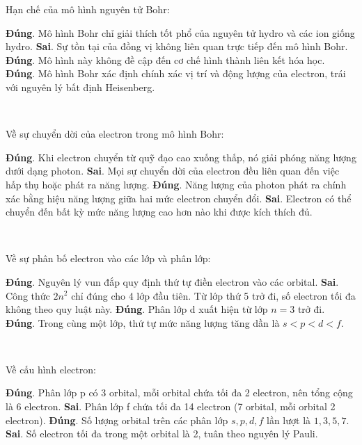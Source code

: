 \def\writeANS{\TLdung{A}\TLsai{B}\TLdung{C}\TLdung{D}}
\begin{loigiaiex}{20}
  Hạn chế của mô hình nguyên tử Bohr: \begin {itemchoice} \itemch \textbf {Đúng}. Mô hình Bohr chỉ giải thích tốt phổ của nguyên tử hydro và các ion giống hydro. \itemch \textbf {Sai}. Sự tồn tại của đồng vị không liên quan trực tiếp đến mô hình Bohr. \itemch \textbf {Đúng}. Mô hình này không đề cập đến cơ chế hình thành liên kết hóa học. \itemch \textbf {Đúng}. Mô hình Bohr xác định chính xác vị trí và động lượng của electron, trái với nguyên lý bất định Heisenberg. \end {itemchoice}  \phantom {a}\hfill { \faKey ~\writeANS }
\end{loigiaiex}
\def\writeANS{\TLdung{C}\TLsai{D}}
\begin{loigiaiex}{21}
  Về sự chuyển dời của electron trong mô hình Bohr: \begin {itemchoice} \itemch \textbf {Đúng}. Khi electron chuyển từ quỹ đạo cao xuống thấp, nó giải phóng năng lượng dưới dạng photon. \itemch \textbf {Sai}. Mọi sự chuyển dời của electron đều liên quan đến việc hấp thụ hoặc phát ra năng lượng. \itemch \textbf {Đúng}. Năng lượng của photon phát ra chính xác bằng hiệu năng lượng giữa hai mức electron chuyển đổi. \itemch \textbf {Sai}. Electron có thể chuyển đến bất kỳ mức năng lượng cao hơn nào khi được kích thích đủ. \end {itemchoice}  \phantom {a}\hfill { \faKey ~\writeANS }
\end{loigiaiex}
\def\writeANS{\TLdung{C}\TLdung{D}}
\begin{loigiaiex}{22}
  Về sự phân bố electron vào các lớp và phân lớp: \begin {itemchoice} \itemch \textbf {Đúng}. Nguyên lý vun đắp quy định thứ tự điền electron vào các orbital. \itemch \textbf {Sai}. Công thức $2n^2$ chỉ đúng cho 4 lớp đầu tiên. Từ lớp thứ 5 trở đi, số electron tối đa không theo quy luật này. \itemch \textbf {Đúng}. Phân lớp d xuất hiện từ lớp $n = 3$ trở đi. \itemch \textbf {Đúng}. Trong cùng một lớp, thứ tự mức năng lượng tăng dần là $s < p < d < f$. \end {itemchoice}  \phantom {a}\hfill { \faKey ~\writeANS }
\end{loigiaiex}
\def\writeANS{\TLdung{C}\TLsai{D}}
\begin{loigiaiex}{23}
  Về cấu hình electron: \begin {itemchoice} \itemch \textbf {Đúng}. Phân lớp p có 3 orbital, mỗi orbital chứa tối đa 2 electron, nên tổng cộng là 6 electron. \itemch \textbf {Sai}. Phân lớp f chứa tối đa 14 electron (7 orbital, mỗi orbital 2 electron). \itemch \textbf {Đúng}. Số lượng orbital trên các phân lớp $s, p, d, f$ lần lượt là $1, 3, 5, 7$. \itemch \textbf {Sai}. Số electron tối đa trong một orbital là 2, tuân theo nguyên lý Pauli. \end {itemchoice}  \phantom {a}\hfill { \faKey ~\writeANS }
\end{loigiaiex}

